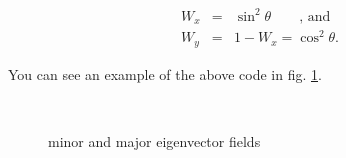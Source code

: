 \documentclass[a4paper,10pt,notitlepage]{scrartcl}
\begin{document}
\begin{eqnarray}
 W_x &=& \sin^2 \theta \qquad \text{, and}\\
 W_y &=& 1 - W_x = \cos^2 \theta .
\end{eqnarray}

You can see an example of the above code in fig. \ref{fig:tfd-majorminor}.

\begin{figure}
  \centering
  \\
  \caption{minor and major eigenvector fields}
  \label{fig:tfd-majorminor}
\end{figure}
\end{document}
